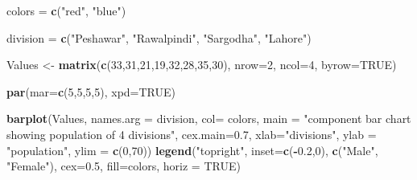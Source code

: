 \documentclass[]{article}
\newenvironment{Shaded}{\begin{snugshade}}{\end{snugshade}}
\newcommand{\DataTypeTok}[1]{\textcolor[rgb]{0.13,0.29,0.53}{#1}}
\newcommand{\DecValTok}[1]{\textcolor[rgb]{0.00,0.00,0.81}{#1}}
\newcommand{\FloatTok}[1]{\textcolor[rgb]{0.00,0.00,0.81}{#1}}
\newcommand{\KeywordTok}[1]{\textcolor[rgb]{0.13,0.29,0.53}{\textbf{#1}}}
\newcommand{\NormalTok}[1]{#1}
\newcommand{\OperatorTok}[1]{\textcolor[rgb]{0.81,0.36,0.00}{\textbf{#1}}}
\newcommand{\OtherTok}[1]{\textcolor[rgb]{0.56,0.35,0.01}{#1}}
\newcommand{\StringTok}[1]{\textcolor[rgb]{0.31,0.60,0.02}{#1}}
\begin{document}
\begin{Shaded}
\begin{Highlighting}[]
\NormalTok{colors =}\StringTok{ }\KeywordTok{c}\NormalTok{(}\StringTok{"red"}\NormalTok{, }\StringTok{"blue"}\NormalTok{)}

\NormalTok{division =}\StringTok{ }\KeywordTok{c}\NormalTok{(}\StringTok{"Peshawar"}\NormalTok{, }\StringTok{"Rawalpindi"}\NormalTok{, }\StringTok{"Sargodha"}\NormalTok{, }\StringTok{"Lahore"}\NormalTok{)}

\NormalTok{Values \textless{}{-}}\StringTok{ }\KeywordTok{matrix}\NormalTok{(}\KeywordTok{c}\NormalTok{(}\DecValTok{33}\NormalTok{,}\DecValTok{31}\NormalTok{,}\DecValTok{21}\NormalTok{,}\DecValTok{19}\NormalTok{,}\DecValTok{32}\NormalTok{,}\DecValTok{28}\NormalTok{,}\DecValTok{35}\NormalTok{,}\DecValTok{30}\NormalTok{), }\DataTypeTok{nrow=}\DecValTok{2}\NormalTok{, }\DataTypeTok{ncol=}\DecValTok{4}\NormalTok{, }\DataTypeTok{byrow=}\OtherTok{TRUE}\NormalTok{)}

\KeywordTok{par}\NormalTok{(}\DataTypeTok{mar=}\KeywordTok{c}\NormalTok{(}\DecValTok{5}\NormalTok{,}\DecValTok{5}\NormalTok{,}\DecValTok{5}\NormalTok{,}\DecValTok{5}\NormalTok{), }\DataTypeTok{xpd=}\OtherTok{TRUE}\NormalTok{)}

\KeywordTok{barplot}\NormalTok{(Values, }\DataTypeTok{names.arg =}\NormalTok{ division, }\DataTypeTok{col=}\NormalTok{ colors, }
        \DataTypeTok{main =} \StringTok{"component bar chart showing population of 4 divisions"}\NormalTok{,}
        \DataTypeTok{cex.main=}\FloatTok{0.7}\NormalTok{,}
        \DataTypeTok{xlab=}\StringTok{"divisions"}\NormalTok{, }\DataTypeTok{ylab =} \StringTok{"population"}\NormalTok{, }\DataTypeTok{ylim =} \KeywordTok{c}\NormalTok{(}\DecValTok{0}\NormalTok{,}\DecValTok{70}\NormalTok{))}
\KeywordTok{legend}\NormalTok{(}\StringTok{"topright"}\NormalTok{, }\DataTypeTok{inset=}\KeywordTok{c}\NormalTok{(}\OperatorTok{{-}}\FloatTok{0.2}\NormalTok{,}\DecValTok{0}\NormalTok{),}
       \KeywordTok{c}\NormalTok{(}\StringTok{"Male"}\NormalTok{, }\StringTok{"Female"}\NormalTok{), }\DataTypeTok{cex=}\FloatTok{0.5}\NormalTok{, }\DataTypeTok{fill=}\NormalTok{colors, }\DataTypeTok{horiz =} \OtherTok{TRUE}\NormalTok{)}
\end{Highlighting}
\end{Shaded}
\end{document}
